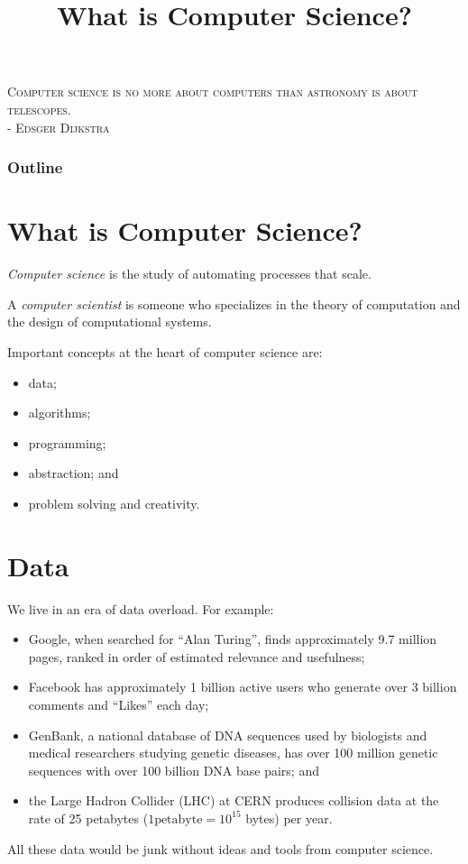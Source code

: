 \documentclass[8pt,a4paper,compress,handout]{beamer}
\title{What is Computer Science?}
\date{}
\begin{document}
\begin{frame}
\begin{flushright}
\tiny \textsc{Computer science is no more about computers than astronomy is about telescopes. \\ - Edsger Dijkstra}
\end{flushright}
\titlepage
\end{frame}

\begin{frame}
\frametitle{Outline}
\tableofcontents
\end{frame}

\section{What is Computer Science?}
\begin{frame}[fragile]
\emph{Computer science} is the study of automating processes that scale. 

\bigskip

A \emph{computer scientist} is someone who specializes in the theory of computation and the design of computational systems.

\bigskip

Important concepts at the heart of computer science are: 
\begin{itemize}
\item data;  
\item algorithms; 
\item programming; 
\item abstraction; and 
\item problem solving and creativity.
\end{itemize}
\end{frame}

\section{Data}
\begin{frame}[fragile]

We live in an era of data overload. For example:
\begin{itemize}
\item Google, when searched for ``Alan Turing'', finds approximately 9.7 million pages, ranked in order of estimated relevance and usefulness; 
\item Facebook has approximately 1 billion active users who generate over 3 billion comments and ``Likes'' each day; 
\item GenBank, a national database of DNA sequences used by biologists and medical researchers studying genetic diseases, has over 100 million genetic sequences with over 100 billion DNA base pairs; and 
\item the Large Hadron Collider (LHC) at CERN produces collision data at the rate of 25 petabytes ($1 \text{petabyte} = 10^{15}$ bytes) per year.
\end{itemize}

\bigskip

All these data would be junk without ideas and tools from computer science.
\end{frame}
\end{document}
